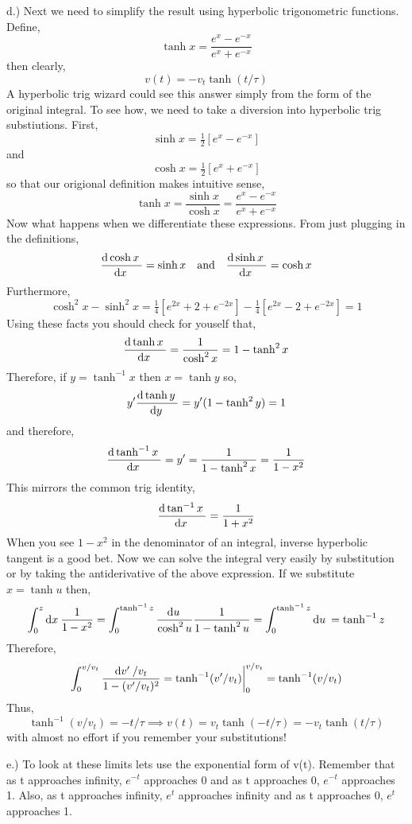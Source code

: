 \documentclass[11pt]{amsart}
\begin{document}
d.) Next we need to simplify the result using hyperbolic trigonometric functions. Define,
\begin{equation*}
\tanh{x} = \frac{e^{x}-e^{-x}}{e^{x}+e^{-x}} 
\end{equation*}
then clearly,
\[ v(t) = - v_t \tanh{(t / \tau) } \]
A hyperbolic trig wizard could see this answer simply from the form of the original integral. To see how, we need to take a diversion into hyperbolic trig substiutions. First,
\[ \sinh{x} = \tfrac{1}{2} \left[ e^x - e^{-x} \right] \]
and 
\[ \cosh{x} = \tfrac{1}{2} \left[ e^x + e^{-x} \right] \]
so that our origional definition makes intuitive sense,
\[ \tanh{x} = \frac{\sinh{x}}{\cosh{x}} = \frac{e^{x}-e^{-x}}{e^{x}+e^{-x}} \]
Now what happens when we differentiate these expressions. From just plugging in the definitions,
\[ \frac{\mathrm{d}\cosh{x} \:}{\mathrm{d}x \:} = \sinh{x} \quad \text{and} \quad \frac{\mathrm{d}\sinh{x} \:}{\mathrm{d}x \:} = \cosh{x} \]
Furthermore,
\[ \cosh^2{x} - \sinh^2{x} = \tfrac{1}{4} \left[ e^{2 x} + 2 + e^{-2x} \right] - \tfrac{1}{4} \left[ e^{2 x} - 2 + e^{-2x} \right] = 1 \]
Using these facts you should check for youself that,
\[ \frac{\mathrm{d}\tanh{x} \:}{\mathrm{d}x \:} = \frac{1}{\cosh^2{x}} = 1 - \tanh^2{x} \]
Therefore, if $y = \tanh^{-1}{x}$ then $x = \tanh{y}$ so,
\[ y' \frac{\mathrm{d}\tanh{y} \:}{\mathrm{d}y \:} = y' (1 - \tanh^2{y}) = 1 \]
and therefore,
\[ \frac{\mathrm{d}\tanh^{-1}{x} \:}{\mathrm{d}x \:} = y' = \frac{1}{1 - \tanh^2{x}} = \frac{1}{1 - x^2} \]
This mirrors the common trig identity,
\[ \frac{\mathrm{d}\tan^{-1}{x} \:}{\mathrm{d}x \:} = \frac{1}{1 + x^2} \]
When you see $1 - x^2$ in the denominator of an integral, inverse hyperbolic tangent is a good bet. Now we can solve the integral very easily by substitution or by taking the antiderivative of the above expression. If we substitute $x = \tanh{u}$ then,
\[ \int_0^z \mathrm{d}x \: \frac{1}{1  - x^2} = \int_0^{\tanh^{-1}{z}} \frac{\mathrm{d}u \:}{\cosh^2{u}} \frac{1}{1 - \tanh^2{u}} = \int_0^{\tanh^{-1}{z}} \mathrm{d}u \: = \tanh^{-1}{z} \]
Therefore,
\begin{align*}
\int_0^{v / v_t} \frac{\mathrm{d}v' \: / v_t}{1 - (v'/v_t)^2} = \tanh^{-1}(v' / v_t) \bigg|_0^{v / v_t} = \tanh^{-1}(v / v_t)
\end{align*}
Thus,
\[ \tanh^{-1}(v / v_t) = - t / \tau \implies v(t) = v_t \tanh{(-t / \tau)} = - v_t \tanh{(t / \tau)} \]
with almost no effort if you remember your substitutions!


e.) To look at these limits lets use the exponential form of v(t). Remember that as t approaches infinity, $e^{-t}$ approaches 0 and as t approaches 0, $e^{-t}$ approaches 1. Also, as t approaches infinity, $e^{t}$ approaches infinity and as t approaches 0, $e^{t}$ approaches 1. \\ 
\end{document}
